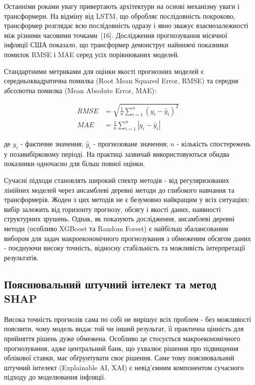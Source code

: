 \documentclass[a4paper,ukrainian,oneside]{extreport}
\begin{document}
Останніми роками увагу привертають архітектури на основі механізму уваги і трансформери. На відміну від LSTM, що обробляє послідовність покроково, трансформер розглядає всю послідовність одразу і явно зважує взаємозалежності між різними часовими точками~[16]. Дослідження прогнозування місячної інфляції США показало, що трансформер демонструє найнижчі показники помилок RMSE і MAE серед усіх порівнюваних моделей.

Стандартними метриками для оцінки якості прогнозних моделей є середньоквадратична помилка (Root Mean Squared Error, RMSE) та середня абсолютна помилка (Mean Absolute Error, MAE):

\begin{equation}
\begin{aligned}
RMSE &= \sqrt{\frac{1}{n}\sum_{i=1}^{n}(y_i - \hat{y}_i)^2} \\[6pt]
MAE  &= \frac{1}{n}\sum_{i=1}^{n}|y_i - \hat{y}_i|
\end{aligned}
\end{equation}

де $y_i$ - фактичне значення; $\hat{y}_i$ - прогнозоване значення; $n$ - кількість спостережень у позавибірковому періоді. На практиці зазвичай використовуються обидва показники одночасно для більш повної оцінки.

Сучасні підходи становлять широкий спектр методів - від регуляризованих лінійних моделей через ансамблеві деревні методи до глибокого навчання та трансформерів. Жоден з цих методів не є безумовно найкращим у всіх ситуаціях: вибір залежить від горизонту прогнозу, обсягу і якості даних, наявності структурних зрушень. Однак, як показують дослідження, ансамблеві деревні методи (особливо XGBoost та Random Forest) є найбільш збалансованим вибором для задач макроекономічного прогнозування з обмеженим обсягом даних - поєднуючи високу точність, відносну стабільність та можливість інтерпретації результатів.

\subsection{Пояснювальний штучний інтелект та метод SHAP}

Висока точність прогнозів сама по собі не вирішує всіх проблем - без можливості пояснити, чому модель видає той чи інший результат, її практична цінність для прийняття рішень дуже обмежена. Особливо це стосується макроекономічного прогнозування, адже центральний банк, що ухвалює рішення про підвищення облікової ставки, має обґрунтувати своє рішення. Саме тому пояснювальний штучний інтелект (Explainable AI, XAI) є невід'ємним компонентом сучасного підходу до моделювання інфляції.
\end{document}
